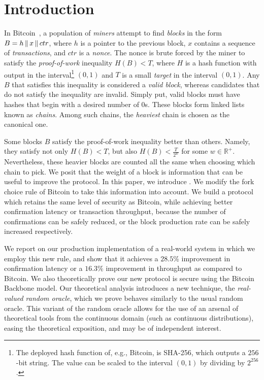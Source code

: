 \section{Introduction}

In Bitcoin~\cite{bitcoin}, a population of \emph{miners}
attempt to find \emph{blocks} in the form $B = h \,\|\, x \,\|\, ctr$,
where $h$ is a pointer to the previous block, $x$ contains a sequence of
\emph{transactions}, and $ctr$ is a \emph{nonce}. The nonce is brute forced
by the miner to satisfy the \emph{proof-of-work} inequality $H(B) < T$, where
$H$ is a hash function with output in the interval\footnote{The deployed hash function of, e.g., Bitcoin,
is SHA-256, which outputs a $256$-bit string. The value can be scaled to the interval $(0, 1)$ by
dividing by $2^{256}$.}
$(0, 1)$
and $T$ is a small \emph{target} in the interval $(0, 1)$. Any $B$ that satisfies this
inequality is considered a \emph{valid block}, whereas candidates that do not satisfy
the inequality are invalid. Simply put, valid blocks must have
hashes that begin with a desired number of $0$s.
These blocks form linked lists known as \emph{chains}.
Among such chains, the \emph{heaviest} chain is chosen as the canonical one.

Some blocks $B$ satisfy the proof-of-work inequality better than others.
Namely, they satisfy not only $H(B) < T$, but also $H(B) < \frac{T}{2^w}$
for some $w \in \mathbb{R}^+$. Nevertheless, these heavier blocks are counted all the same when choosing
which chain to pick.
We posit that the weight of a block is information
that can be useful to improve the protocol.
In this paper, we introduce \emph{\poem}.
We modify the fork choice rule of Bitcoin to take this information into account.
We build a protocol which retains the same level of security as Bitcoin, while achieving
better confirmation latency or transaction throughput, because the number of confirmations
can be safely reduced, or the block production rate can be safely increased respectively.

We report on our production implementation of a real-world system
in which we employ this new rule, and show that it achieves a $28.5\%$
improvement in confirmation latency
or a $16.3\%$ improvement in throughput as compared to Bitcoin.
We also theoretically prove our new protocol is secure
using the Bitcoin Backbone model. Our theoretical analysis introduces
a new technique, the \emph{real-valued random oracle}, which we prove behaves
similarly to the usual random oracle. This variant of the
random oracle allows for the use of an arsenal of theoretical tools from the
continuous domain (such as continuous distributions), easing the theoretical
exposition, and may be of independent interest.

